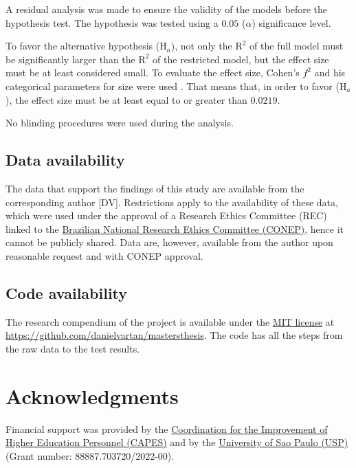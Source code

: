 \documentclass[
12pt,
openright,
oneside,
a4paper,
chapter=TITLE,
section=TITLE,
french,
spanish,
brazil,
english
]{abntex2}\usepackage{array}
\begin{document}
A residual analysis was made to ensure the validity of the models before
the hypothesis test. The hypothesis was tested using a \(0.05\)
(\(\alpha\)) significance level.

To favor the alternative hypothesis (\(\text{H}_{a}\)), not only the
\(\text{R}^{2}\) of the full model must be significantly larger than the
\(\text{R}^{2}\) of the restricted model, but the effect size must be at
least considered small. To evaluate the effect size, Cohen's \(f^{2}\)
and his categorical parameters for size were used \autocite{cohen1992}.
That means that, in order to favor (\(\text{H}_{a}\)), the effect size
must be at least equal to or greater than \(0.0219\).

No blinding procedures were used during the analysis.

\subsection{Data availability}\label{data-availability}

The data that support the findings of this study are available from the
corresponding author {[}DV{]}. Restrictions apply to the availability of
these data, which were used under the approval of a Research Ethics
Committee (REC) linked to the
\href{https://conselho.saude.gov.br/Web_comissoes/conep/index.html}{Brazilian
National Research Ethics Committee (CONEP)}, hence it cannot be publicly
shared. Data are, however, available from the author upon reasonable
request and with CONEP approval.

\subsection{Code availability}\label{code-availability}

The research compendium of the project is available under the
\href{https://opensource.org/license/mit/}{MIT license} at
\url{https://github.com/danielvartan/mastersthesis}. The code has all
the steps from the raw data to the test results.

\section{Acknowledgments}\label{acknowledgments}

Financial support was provided by the
\href{https://www.gov.br/capes/}{Coordination for the Improvement of
Higher Education Personnel (CAPES)} and by the
\href{http://usp.br/}{University of Sao Paulo (USP)} (Grant number:
88887.703720/2022-00).
\end{document}

